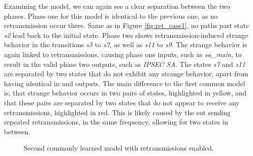 Examining the model, we can again see a clear separation between the two phases. Phase one for this model is identical to the previous one, as no retransmission occur there. Same as in Figure \ref{fig:ret_case1}, no paths past state \emph{s2} lead back to the initial state. Phase two shows retransmission-induced strange behavior in the transitions \emph{s5} to \emph{s7}, as well as \emph{s11} to \emph{s9}. The strange behavior is again linked to retransmissions, causing phase one inputs, such as \emph{sa\_main}, to result in the valid phase two outputs, such as \emph{IPSEC SA}. The states \emph{s7} and \emph{s11} are separated by two states that do not exhibit any strange behavior, apart from having identical in and outputs. The main difference to the first common model is, that strange behavior occurs in two pairs of states, highlighted in yellow, and that these pairs are separated by two states that do not appear to receive any retransmissions, highlighted in red. This is likely caused by the \ac{sut} sending repeated retransmissions, in the same frequency, allowing for two states in between. 

\begin{figure}[ht]
	\vspace*{\fill}
	\noindent
	\hspace*{-5.5\oddsidemargin}%
	\caption{Second commonly learned model with retransmissions enabled.}
	\label{fig:ret_case2}
	\vspace*{\fill}
\end{figure}
\newpage

